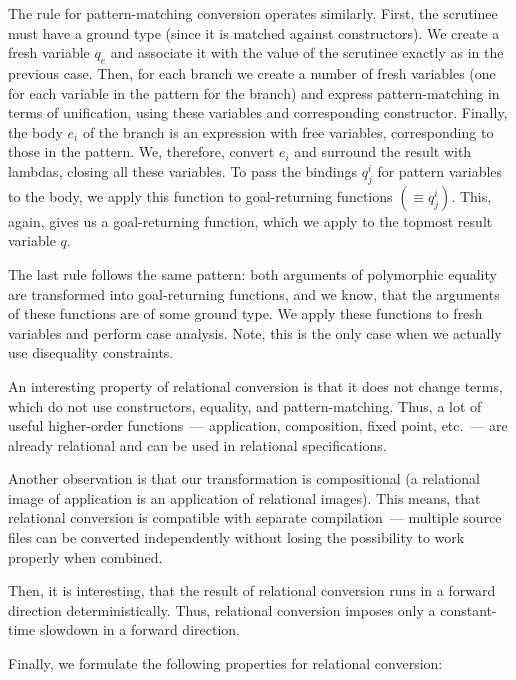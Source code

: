The rule for pattern-matching conversion operates similarly. First, the scrutinee must have a ground type (since it is matched against
constructors). We create a fresh variable $q_e$ and associate it with the value of the scrutinee exactly as in the previous
case. Then, for each branch we create a number of fresh variables (one for each variable in the pattern for the branch) and
express pattern-matching in terms of unification, using these variables and corresponding constructor. Finally, the body $e_i$ of the branch
is an expression with free variables, corresponding to those in the pattern. We, therefore, convert $e_i$ and surround the result with
lambdas, closing all these variables. To pass the bindings $q^i_j$ for pattern variables to the body, we apply this function to
 goal-returning functions $(\equiv q^i_j)$. This, again, gives us a goal-returning function, which we apply to the topmost result variable $q$.

The last rule follows the same pattern: both arguments of polymorphic equality are transformed into goal-returning functions, and we know, that
the arguments of these functions are of some ground type. We apply these functions to fresh variables and perform case analysis. Note, this is
the only case when we actually use disequality constraints.

An interesting property of relational conversion is that it does not change terms, which do not use constructors, equality, and pattern-matching. Thus,
a lot of useful higher-order functions~--- application, composition, fixed point, etc.~--- are already relational and can be used in
relational specifications.

Another observation is that our transformation is compositional (a relational image of application is an application of relational
images). This means, that relational conversion is compatible with separate compilation~--- multiple source files can be
converted independently without losing the possibility to work properly when combined.

Then, it is interesting, that the result of relational conversion runs in a forward direction
deterministically. Thus, relational conversion imposes only a constant-time slowdown in a forward
direction.

Finally, we formulate the following properties for relational conversion:

